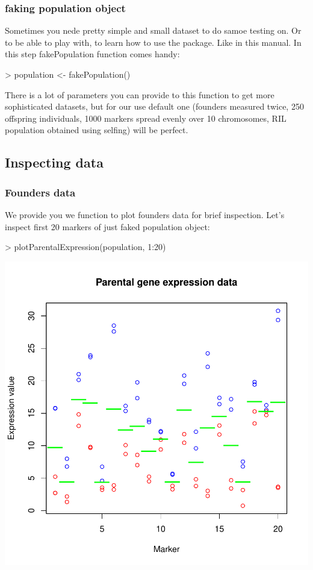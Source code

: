 \documentclass{article}
\begin{document}
\subsubsection{faking population object}
Sometimes you nede pretty simple and small dataset to do samoe testing on. Or to be able to play with, to learn how to use the package. Like in this manual. In this step fakePopulation function comes handy: 
\begin{Schunk}
\begin{Sinput}
> population <- fakePopulation()
\end{Sinput}
\end{Schunk}
There is a lot of parameters you can provide to this function to get more sophisticated datasets, but for our use default one (founders measured twice, 250 offspring individuals, 1000 markers spread evenly over 10 chromosomes, 
RIL population obtained using selfing) will be perfect. 
\newpage
\subsection{Inspecting data}
\subsubsection{Founders data}
We provide you we function to plot founders data for brief inspection. Let's inspect first 20 markers of just faked population object:

\begin{Schunk}
\begin{Sinput}
> plotParentalExpression(population, 1:20)
\end{Sinput}
\end{Schunk}
\includegraphics{manual-006}
\end{document}
